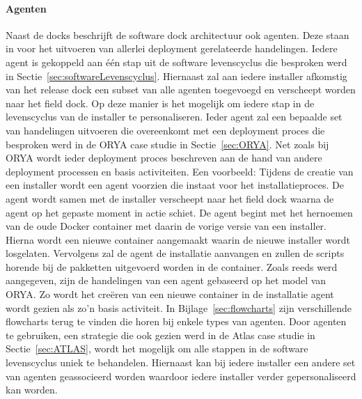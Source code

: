 \paragraph{Agenten}
Naast de docks beschrijft de software dock architectuur ook agenten.
Deze staan in voor het uitvoeren van allerlei deployment gerelateerde handelingen.
Iedere agent is gekoppeld aan één stap uit de software levenscyclus die besproken werd in Sectie~\vref{sec:softwareLevenscyclus}.
Hiernaast zal aan iedere installer afkomstig van het release dock een subset van alle agenten toegevoegd en verscheept worden naar het field dock.
Op deze manier is het mogelijk om iedere stap in de levenscyclus van de installer te personaliseren.
Ieder agent zal een bepaalde set van handelingen uitvoeren die overeenkomt met een deployment proces die besproken werd in de ORYA case studie in Sectie~\vref{sec:ORYA}.
Net zoals bij ORYA wordt ieder deployment proces beschreven aan de hand van andere deployment processen en basis activiteiten.
Een voorbeeld:
Tijdens de creatie van een installer wordt een agent voorzien die instaat voor het installatieproces.
De agent wordt samen met de installer verscheept naar het field dock waarna de agent op het gepaste moment in actie schiet.
De agent begint met het hernoemen van de oude Docker container met daarin de vorige versie van een installer.
Hierna wordt een nieuwe container aangemaakt waarin de nieuwe installer wordt losgelaten.
Vervolgens zal de agent de installatie aanvangen en zullen de scripts horende bij de pakketten uitgevoerd worden in de container.
Zoals reeds werd aangegeven, zijn de handelingen van een agent gebaseerd op het model van ORYA.
Zo wordt het creëren van een nieuwe container in de installatie agent wordt gezien als zo'n basis activiteit.
In Bijlage~\vref{sec:flowcharts} zijn verschillende flowcharts terug te vinden die horen bij enkele types van agenten.
Door agenten te gebruiken, een strategie die ook gezien werd in de Atlas case studie in Sectie~\vref{sec:ATLAS}, wordt het mogelijk om alle stappen in de software levenscyclus uniek te behandelen.
Hiernaast kan bij iedere installer een andere set van agenten geassocieerd worden waardoor iedere installer verder gepersonaliseerd kan worden.

